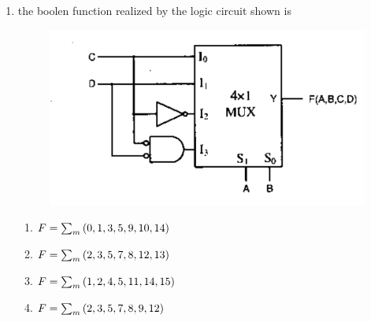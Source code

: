 \documentclass[12pt,-letter paper]{article}
\begin{document}
\begin{enumerate}
\item the boolen function realized by the logic circuit shown is
\begin{figure}[H]
\includegraphics[width=\columnwidth]{./gate1.png}
\label{fig:fig1}
\caption{}
\end{figure}

\begin{enumerate}
	\item $F=\sum_m\left(0,1,3,5,9,10,14\right)$
	\item $F=\sum_m\left(2,3,5,7,8,12,13\right)$
	\item $F=\sum_m\left(1,2,4,5,11,14,15\right)$
	\item $F=\sum_m\left(2,3,5,7,8,9,12\right)$	
\end{enumerate}

\end{enumerate}
\end{document}

